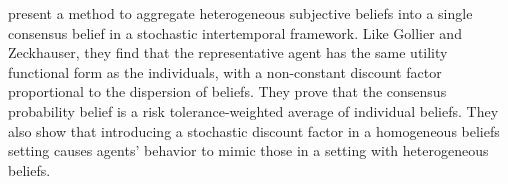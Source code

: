 \documentclass{hw}
\begin{document}
\cite{jouini07} present a method to aggregate heterogeneous subjective beliefs into a single consensus belief in a stochastic intertemporal framework. Like Gollier and Zeckhauser, they find that the representative agent has the same utility functional form as the individuals, with a non-constant discount factor proportional to the dispersion of beliefs. They prove that the consensus probability belief is a risk tolerance-weighted average of individual beliefs. They also show that introducing a stochastic discount factor in a homogeneous beliefs setting causes agents' behavior to mimic those in a setting with heterogeneous beliefs.



\end{document}
